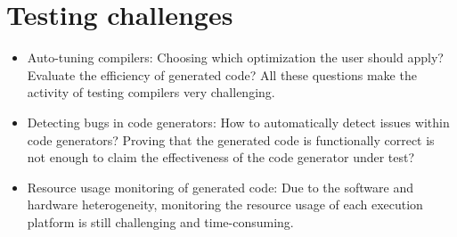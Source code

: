 \section{Testing challenges}

\begin{itemize}
	\item Auto-tuning compilers: Choosing which optimization the user should apply? Evaluate the efficiency of generated code? All these questions make the activity of testing compilers very challenging.
	\item Detecting bugs in code generators: How to automatically detect issues within code generators? Proving that the generated code is functionally correct is not enough to claim the effectiveness of the code generator under test?
	\item Resource usage monitoring of generated code: Due to the software and hardware heterogeneity, monitoring the resource usage of each execution platform is still challenging and time-consuming. 
\end{itemize}

